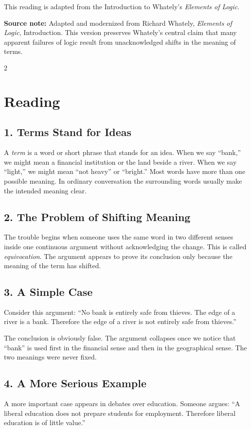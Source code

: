 \documentclass[12pt]{article}
\newcommand{\focusbox}[1]{%
\vspace{0.4em}\noindent\colorbox{gray!12}{\begin{minipage}{0.96\linewidth}#1\end{minipage}}\vspace{0.5em}}
\begin{document}
This reading is adapted from the Introduction to Whately's \textit{Elements of Logic}.

\focusbox{\textbf{Source note:} Adapted and modernized from Richard Whately, \textit{Elements of Logic}, Introduction. This version preserves Whately's central claim that many apparent failures of logic result from unacknowledged shifts in the meaning of terms.}

\begin{multicols}{2}
\section*{Reading}

\subsection*{1. Terms Stand for Ideas}
A \textit{term} is a word or short phrase that stands for an idea. When we say “bank,” we might mean a financial institution or the land beside a river. When we say “light,” we might mean “not heavy” or “bright.” Most words have more than one possible meaning. In ordinary conversation the surrounding words usually make the intended meaning clear.

\subsection*{2. The Problem of Shifting Meaning}
The trouble begins when someone uses the same word in two different senses inside one continuous argument without acknowledging the change. This is called \textit{equivocation}. The argument appears to prove its conclusion only because the meaning of the term has shifted.

\subsection*{3. A Simple Case}
Consider this argument: “No bank is entirely safe from thieves. The edge of a river is a bank. Therefore the edge of a river is not entirely safe from thieves.”

The conclusion is obviously false. The argument collapses once we notice that “bank” is used first in the financial sense and then in the geographical sense. The two meanings were never fixed.

\subsection*{4. A More Serious Example}
A more important case appears in debates over education. Someone argues: “A liberal education does not prepare students for employment. Therefore liberal education is of little value.”


\end{multicols}
\end{document}
